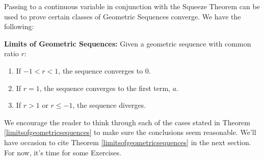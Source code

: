 \documentclass{ximera}
\begin{document}
Passing to a continuous variable in conjunction with the Squeeze Theorem can be used to prove certain classes of Geometric Sequences converge.  We have the following:





\begin{theorem}\label{limitsofgeometricsequences}  \textbf{Limits of Geometric Sequences:}  Given a geometric sequence with common ratio $r$:


\begin{enumerate}

\item If $-1 < r < 1$, the sequence converges to $0$.



\item If $r=1$, the sequence converges to the first term, $a$.



\item If $r> 1$ or $r \leq -1$, the sequence diverges.

\end{enumerate}

\end{theorem}




We encourage the reader to think through each of the cases stated in Theorem \ref{limitsofgeometricsequences} to make sure the conclusions seem reasonable.  We'll have occasion to cite Theorem \ref{limitsofgeometricsequences} in the next section.  For now, it's time for some Exercises. 




\closegraphsfile
\end{document}
